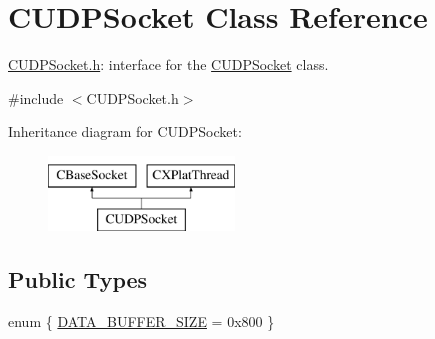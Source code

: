 \hypertarget{class_c_u_d_p_socket}{\section{\-C\-U\-D\-P\-Socket \-Class \-Reference}
\label{class_c_u_d_p_socket}
}


\hyperlink{_c_u_d_p_socket_8h}{\-C\-U\-D\-P\-Socket.\-h}\-: interface for the \hyperlink{class_c_u_d_p_socket}{\-C\-U\-D\-P\-Socket} class.  




{\ttfamily \#include $<$\-C\-U\-D\-P\-Socket.\-h$>$}

\-Inheritance diagram for \-C\-U\-D\-P\-Socket\-:\begin{figure}[H]
\begin{center}
\leavevmode
\includegraphics[height=2.000000cm]{class_c_u_d_p_socket}
\end{center}
\end{figure}
\subsection*{\-Public \-Types}
\begin{DoxyCompactItemize}
\item 
enum \{ \hyperlink{class_c_u_d_p_socket_a47208bbacf51eb5dcf13676e275b74faac90ae17c9b44fb66c6dd1c532e67c1e0}{\-D\-A\-T\-A\-\_\-\-B\-U\-F\-F\-E\-R\-\_\-\-S\-I\-Z\-E} =  0x800
 \}
\end{DoxyCompactItemize}
